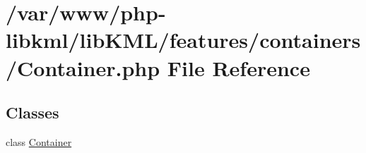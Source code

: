 \hypertarget{Container_8php}{
\section{/var/www/php-\/libkml/libKML/features/containers/Container.php File Reference}
\label{dc/d66/Container_8php}
}
\subsection*{Classes}
\begin{DoxyCompactItemize}
\item 
class \hyperlink{classContainer}{Container}
\end{DoxyCompactItemize}
